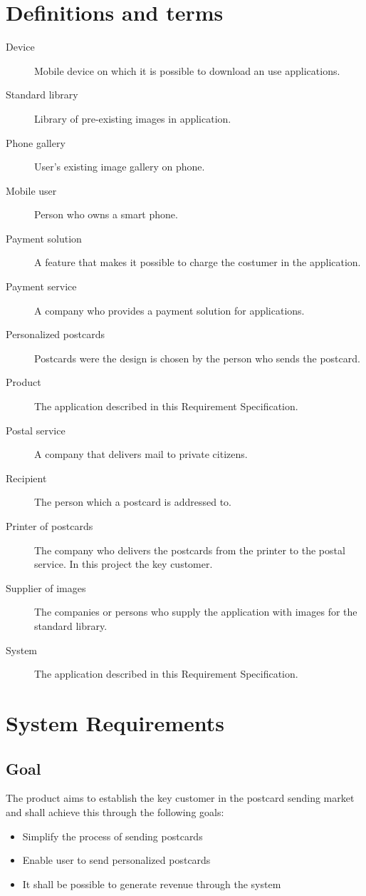 \documentclass[10pt,a4paper]{article}
\begin{document}
\section{Definitions and terms}
\begin{description}
\item[Device] Mobile device on which it is possible to download an use applications.
\item[Standard library] Library of pre-existing images in application.
\item[Phone gallery] User's existing image gallery on phone.
\item[Mobile user] Person who owns a smart phone. 
\item[Payment solution] A feature that makes it possible to charge the costumer in the application. 
\item[Payment service] A company who provides a payment solution for applications. 
\item[Personalized postcards] Postcards were the design is chosen by the person who sends the postcard. 
\item[Product]The application described in this Requirement Specification.
\item[Postal service] A company that delivers mail to private citizens.
\item[Recipient]The person which a postcard is addressed to.
\item[Printer of postcards] The company who delivers the postcards from the printer to the postal service. In this project the key customer.
\item[Supplier of images] The companies or persons who supply the application with images for the standard library.
\item[System] The application described in this Requirement Specification.
\end{description}

\section{System Requirements}

\subsection{Goal}
The product aims to establish the key customer in the postcard sending market and shall achieve this through the following goals:

\begin{itemize}
\item Simplify the process of sending postcards
\item Enable user to send personalized postcards
\item It shall be possible to generate revenue through the system
\end{itemize}
\end{document}
